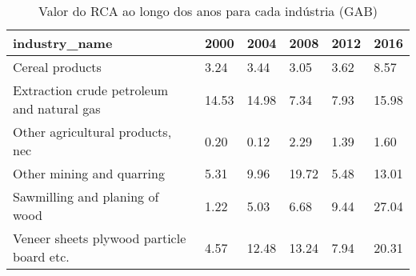 \begin{table}
\centering
\caption{Valor do RCA ao longo dos anos para cada indústria (GAB)}
\begin{tabular}{p{6cm}p{1.5cm}p{1.5cm}p{1.5cm}p{1.5cm}p{1.5cm}}
\toprule
                             industry\_name &  2000 &  2004 &  2008 & 2012 &  2016 \\
\midrule
                           Cereal products &  3.24 &  3.44 &  3.05 & 3.62 &  8.57 \\
Extraction crude petroleum and natural gas & 14.53 & 14.98 &  7.34 & 7.93 & 15.98 \\
          Other agricultural products, nec &  0.20 &  0.12 &  2.29 & 1.39 &  1.60 \\
                 Other mining and quarring &  5.31 &  9.96 & 19.72 & 5.48 & 13.01 \\
            Sawmilling and planing of wood &  1.22 &  5.03 &  6.68 & 9.44 & 27.04 \\
 Veneer sheets plywood particle board etc. &  4.57 & 12.48 & 13.24 & 7.94 & 20.31 \\
\bottomrule
\end{tabular}
\end{table}
